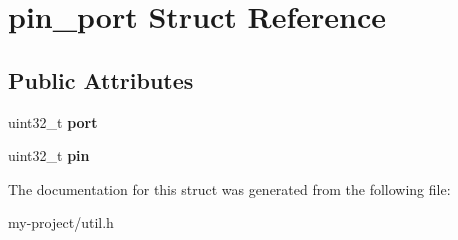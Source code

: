 \hypertarget{structpin__port}{}\section{pin\+\_\+port Struct Reference}
\label{structpin__port}
\subsection*{Public Attributes}
\begin{DoxyCompactItemize}
\item 
\mbox{\label{structpin__port_ad41cf557214eea4890240f05a6a88357}} 
uint32\+\_\+t {\bfseries port}
\item 
\mbox{\label{structpin__port_ad42848977471e80bba0086007b019c91}} 
uint32\+\_\+t {\bfseries pin}
\end{DoxyCompactItemize}


The documentation for this struct was generated from the following file\+:\begin{DoxyCompactItemize}
\item 
my-\/project/util.\+h\end{DoxyCompactItemize}
